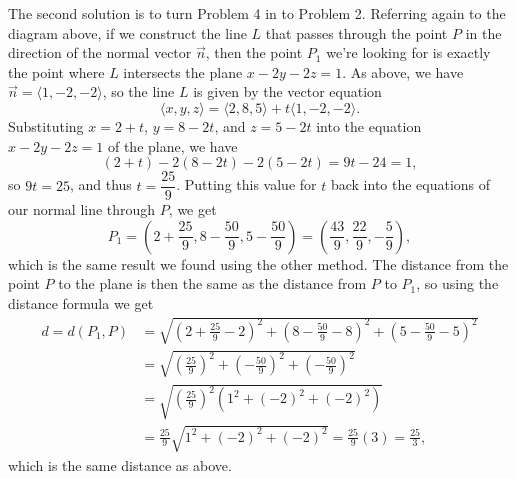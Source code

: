 \documentclass[12pt]{article}
\begin{document}
\begin{enumerate}
The second solution is to turn Problem 4 in to Problem 2. Referring again to the diagram above, if we construct the line $L$ that passes through the point $P$ in the direction of the normal vector $\vec{n}$, then the point $P_1$ we're looking for is exactly the point where $L$ intersects the plane $x-2y-2z=1$. As above, we have $\vec{n} = \langle 1, -2, -2\rangle$, so the line $L$ is given by the vector equation
\[
 \langle x, y, z\rangle = \langle 2, 8, 5\rangle + t\langle 1, -2, -2\rangle.
\]
Substituting $x=2+t$, $y=8-2t$, and $z=5-2t$ into the equation $x-2y-2z=1$ of the plane, we have
\[
 (2+t)-2(8-2t)-2(5-2t) = 9t-24=1,
\]
so $9t=25$, and thus $t=\dfrac{25}{9}$. Putting this value for $t$ back into the equations of our normal line through $P$, we get
\[
 P_1 = \left(2+\frac{25}{9},8-\frac{50}{9}, 5-\frac{50}{9}\right) = \left(\frac{43}{9},\frac{22}{9},-\frac{5}{9}\right),
\]
which is the same result we found using the other method. The distance from the point $P$ to the plane is then the same as the distance from $P$ to $P_1$, so using the distance formula we get
\begin{align*}
 d = d(P_1,P) &= \sqrt{\left(2+\frac{25}{9}-2\right)^2+\left(8-\frac{50}{9} - 8\right)^2 + \left(5-\frac{50}{9}-5\right)^2}\\
& = \sqrt{\left(\frac{25}{9}\right)^2+\left(-\frac{50}{9}\right)^2 + \left(-\frac{50}{9}\right)^2}\\
& = \sqrt{\left(\frac{25}{9}\right)^2(1^2+(-2)^2+(-2)^2)}\\
& = \frac{25}{9}\sqrt{1^2+(-2)^2+(-2)^2} = \frac{25}{9}(3) = \frac{25}{3},
\end{align*}
which is the same distance as above.


 \end{enumerate}
\end{document}
